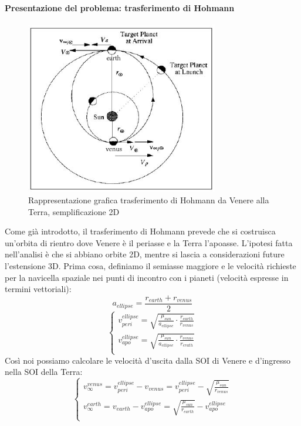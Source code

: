\documentclass[a4paper]{article}
\begin{document}
\paragraph{Presentazione del problema: trasferimento di Hohmann\newline}
\textit{ }
\begin{figure}[h]
\centering
\includegraphics[width=0.75\textwidth]{Hohmann.png}
\caption{Rappresentazione grafica trasferimento di Hohmann da Venere alla Terra, semplificazione 2D}
\end{figure}
\newline
Come già introdotto, il trasferimento di Hohmann prevede che si costruisca un'orbita di rientro dove Venere è il periasse e la Terra l'apoasse. L'ipotesi fatta nell'analisi è che si abbiano orbite 2D, mentre si lascia a considerazioni future l'estensione 3D. \newline Prima cosa, definiamo il semiasse maggiore e le velocità richieste per la navicella spaziale nei punti di incontro con i pianeti (velocità espresse in termini vettoriali):
\[
a_{ellipse} = \frac{r_{earth}+r_{venus}}{2}
\]
\newline
\[
\begin{cases}
\textit{v}_{peri}^{ellipse} = \sqrt{\frac{\mu_{sun}}{a_{ellipse}} \cdot \frac{r_{earth}}{r_{venus}}} \\
\textit{v}_{apo}^{ellipse} = \sqrt{\frac{\mu_{sun}}{a_{ellipse}} \cdot \frac{r_{venus}}{r_{erath}}} \\
\end{cases}
\]
Così noi possiamo calcolare le velocità d'uscita dalla SOI di Venere e d'ingresso nella SOI della Terra:
\[
\begin{cases}
\textit{v}_{\infty}^{venus} = \textit{v}_{peri}^{ellipse} - \textit{v}_{venus} = \textit{v}_{peri}^{ellipse} - \sqrt{\frac{\mu_{sun}}{r_{venus}}} \\
\textit{v}_{\infty}^{earth} =  \textit{v}_{earth} - \textit{v}_{apo}^{ellipse} = \sqrt{\frac{\mu_{sun}}{r_{earth}}} - \textit{v}_{apo}^{ellipse} \\
\end{cases}
\]
\end{document}
